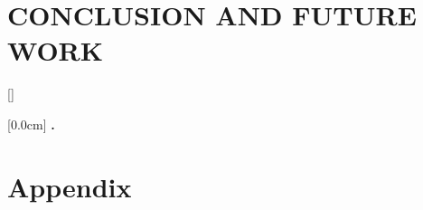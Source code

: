 \documentclass[a4paper,13pt,3p,twoside]{report}
\renewcommand{\bibname}{reference}
\renewcommand{\figurename}{Figure}
\renewcommand{\tablename}{Table}
\renewcommand{\chaptername}{Chapter}
\theoremstyle{plain}
\theoremstyle{definition}
\begin{document}
\newpage

\chapter{CONCLUSION AND FUTURE WORK} %
\label{chapter:conclusion}


% 


\newpage
\renewcommand\bibname{REFERENCE}
\printbibliography
{}

\appendixpage
\appendices
\addappheadtotoc
\renewcommand{\figurename}{Figure}
\renewcommand{\tablename}{Table}
\renewcommand{\chaptername}{CHAPTER}


{}[]
\titlespacing*{\chapter}{0pt}{-20pt}{20pt}

    [0.0cm]             %
    {\bfseries\vspace{0.3cm}}                  %
    {{\bfseries{\scshape} \thecontentslabel.\ }} %
    {}         %
    {\contentspage}         %

\chapter{Appendix}
\label{chapter:Appendix}

\end{document}
